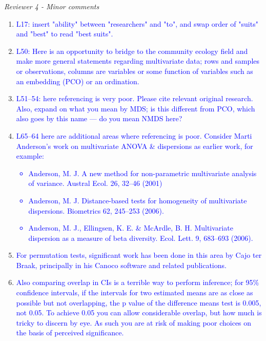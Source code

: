 \documentclass[12pt,letterpaper]{article}
\renewcommand{\subsection}[1]{%
\bigskip
\begin{center}
\begin{large}
\normalfont\itshape #1
\end{large}
\end{center}}
\begin{document}
\subsection{Reviewer 4 - Minor comments}

\begin{enumerate}

\item{\textcolor{blue}{L17: insert "ability" between "researchers" and "to", and swap order of "suits" and "best" to read "best suits".}}

\item{\textcolor{blue}{L50: Here is an opportunity to bridge to the community ecology field and make more general statements regarding multivariate data; rows and samples or observations, columns are variables or some function of variables such as an embedding (PCO) or an ordination.}}

\item{\textcolor{blue}{L51--54: here referencing is very poor. Please cite relevant original research. Also, expand on what you mean by MDS; is this different from PCO, which also goes by this name --- do you mean NMDS here?}}

\item{\textcolor{blue}{L65--64 here are additional areas where referencing is poor. Consider Marti Anderson's work on multivariate ANOVA \& dispersions as earlier work, for example:
\begin{itemize}
\item Anderson, M. J. A new method for non-parametric multivariate analysis of variance. Austral Ecol. 26, 32–46 (2001)
\item Anderson, M. J. Distance-based tests for homogeneity of multivariate dispersions. Biometrics 62, 245–253 (2006).
\item Anderson, M. J., Ellingsen, K. E. \& McArdle, B. H. Multivariate dispersion as a measure of beta diversity. Ecol. Lett. 9, 683–693 (2006).
\end{itemize}
}}

\item{\textcolor{blue}{For permutation tests, significant work has been done in this area by Cajo ter Braak, principally in his Canoco software and related publications.}}

\item{\textcolor{blue}{Also comparing overlap in CIs is a terrible way to perform inference; for 95\% confidence intervals, if the intervals for two estimated means are as close as possible but not overlapping, the p value of the difference means test is 0.005, not 0.05. To achieve 0.05 you can allow considerable overlap, but how much is tricky to discern by eye. As such you are at risk of making poor choices on the basis of perceived significance.}}


\end{enumerate}
\end{document}
